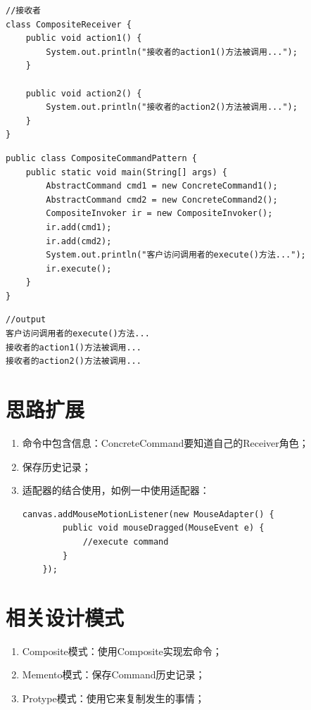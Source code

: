 \begin{lstlisting}
//接收者
class CompositeReceiver {
	public void action1() {
		System.out.println("接收者的action1()方法被调用...");
	}
	
	public void action2() {
		System.out.println("接收者的action2()方法被调用...");
	}
}
\end{lstlisting}
\begin{lstlisting}
public class CompositeCommandPattern {
	public static void main(String[] args) {
		AbstractCommand cmd1 = new ConcreteCommand1();
		AbstractCommand cmd2 = new ConcreteCommand2();
		CompositeInvoker ir = new CompositeInvoker();
		ir.add(cmd1);
		ir.add(cmd2);
		System.out.println("客户访问调用者的execute()方法...");
		ir.execute();
	}
}
\end{lstlisting}
\begin{lstlisting}
//output
客户访问调用者的execute()方法...
接收者的action1()方法被调用...
接收者的action2()方法被调用...
\end{lstlisting}
\section{思路扩展}
\begin{enumerate}
	\item 命令中包含信息：ConcreteCommand要知道自己的Receiver角色；
	\item 保存历史记录；
	\item 适配器的结合使用，如例一中使用适配器：
	\begin{lstlisting}
canvas.addMouseMotionListener(new MouseAdapter() {
		public void mouseDragged(MouseEvent e) {
			//execute command
		}
	});
	\end{lstlisting}
\end{enumerate}
\section{相关设计模式}
\begin{enumerate}
	\item Composite模式：使用Composite实现宏命令；
	\item Memento模式：保存Command历史记录；
	\item Protype模式：使用它来复制发生的事情；
\end{enumerate}